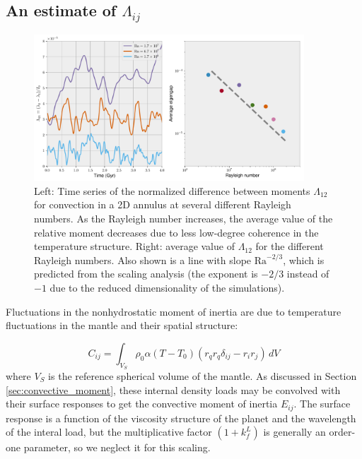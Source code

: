 \documentclass[extra,mreferee]{gji}
\begin{document}
\subsection{An estimate of $\Lambda_{ij}$}
\label{sec:lambda}

\begin{figure}
\centering
\includegraphics[width=0.9\textwidth]{figures/eigengap.pdf}
\caption{ Left: Time series of the normalized difference between moments $\Lambda_{12}$ for convection in a 2D annulus at several different Rayleigh numbers.  As the Rayleigh number increases, the average value of the relative moment decreases due to less low-degree coherence in the temperature structure.  Right:  average value of $\Lambda_{12}$ for the different Rayleigh numbers.  Also shown is a line with slope $\mathrm{Ra}^{-2/3}$, which is predicted from the scaling analysis (the exponent is $-2/3$ instead of $-1$ due to the reduced dimensionality of the simulations).}
\label{fig:eigengap}
\end{figure}


Fluctuations in the nonhydrostatic moment of inertia are due to temperature fluctuations in the mantle and their spatial structure:

\begin{equation}
C_{ij} = \int_{V_S} \rho_0 \alpha (T-T_0) \left( r_q r_q \delta_{ij} - r_i r_j \right) \,dV
\label{eq:temperature_fluctuations}
\end{equation}
where $V_S$ is the reference spherical volume of the mantle.
As discussed in Section \ref{sec:convective_moment}, these internal density loads may be convolved with their surface responses to get the convective moment of inertia $E_{ij}$.
The surface response is a function of the viscosity structure of the planet and the wavelength of the interal load, but the multiplicative factor $(1+k^L_f)$ is generally an order-one parameter, so we neglect it for this scaling.
\end{document}
